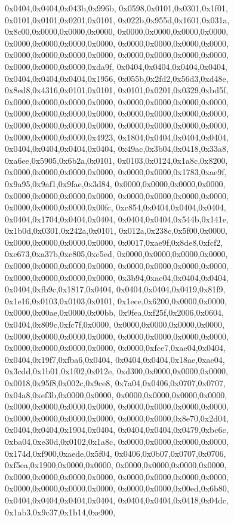 {	0x0404,0x0404,0x043b,0x996b,
	0x0598,0x0101,0x0301,0x1f01,
	0x0101,0x0101,0x0201,0x0101,
	0x022b,0x955d,0x1601,0x031a,
	0x8c00,0x0000,0x0000,0x0000,
	0x0000,0x0000,0x0000,0x0000,
	0x0000,0x0000,0x0000,0x0000,
	0x0000,0x0000,0x0000,0x0000,
	0x0000,0x0000,0x0000,0x0000,
	0x0000,0x0000,0x0000,0x0000,
	0x0000,0x0000,0x0000,0xda9f,
	0x0404,0x0404,0x0404,0x0404,
	0x0404,0x0404,0x0404,0x1956,
	0x055b,0x2fd2,0x56d3,0xd48e,
	0x8ed8,0x4316,0x0101,0x0101,
	0x0101,0x0201,0x0329,0xbd5f,
	0x0000,0x0000,0x0000,0x0000,
	0x0000,0x0000,0x0000,0x0000,
	0x0000,0x0000,0x0000,0x0000,
	0x0000,0x0000,0x0000,0x0000,
	0x0000,0x0000,0x0000,0x0000,
	0x0000,0x0000,0x0000,0x0000,
	0x0000,0x0000,0x0000,0x4923,
	0x1804,0x0404,0x0404,0x0404,
	0x0404,0x0404,0x0404,0x0404,
	0x49ac,0x3b04,0x0418,0x33a8,
	0xa6ee,0x5905,0x6b2a,0x0101,
	0x0103,0x0124,0x1a8c,0x8200,
	0x0000,0x0000,0x0000,0x0000,
	0x0000,0x0000,0x1783,0xae9f,
	0x9a95,0x9af1,0x9fae,0x3d84,
	0x0000,0x0000,0x0000,0x0000,
	0x0000,0x0000,0x0000,0x0000,
	0x0000,0x0000,0x0000,0x0000,
	0x0000,0x0000,0x0000,0x00fc,
	0xc854,0x0404,0x0404,0x0404,
	0x0404,0x1704,0x0404,0x0404,
	0x0404,0x0404,0x544b,0x141e,
	0x1b0d,0x0301,0x242a,0x0101,
	0x012a,0x238c,0x5f00,0x0000,
	0x0000,0x0000,0x0000,0x0000,
	0x0017,0xae9f,0x8de8,0xfcf2,
	0xe673,0xa37b,0xe805,0xc5ed,
	0x0000,0x0000,0x0000,0x0000,
	0x0000,0x0000,0x0000,0x0000,
	0x0000,0x0000,0x0000,0x0000,
	0x0000,0x0000,0x0000,0x0000,
	0x3b94,0xae04,0x0404,0x0404,
	0x0404,0xfb9c,0x1817,0x0404,
	0x0404,0x0404,0x0419,0x81f9,
	0x1e16,0x0103,0x0103,0x0101,
	0x1ece,0x6200,0x0000,0x0000,
	0x0000,0x00ae,0x0000,0x00bb,
	0x9fea,0xf25f,0x2006,0x0604,
	0x0404,0x809c,0xfc7f,0x0000,
	0x0000,0x0000,0x0000,0x0000,
	0x0000,0x0000,0x0000,0x0000,
	0x0000,0x0000,0x0000,0x0000,
	0x0000,0x0000,0x0000,0x0000,
	0x0000,0xfce7,0xae04,0x0404,
	0x0404,0x19f7,0xfba6,0x0404,
	0x0404,0x0404,0x18ae,0xae04,
	0x3cdd,0x1b01,0x1f02,0x012e,
	0xd300,0x0000,0x0000,0x0000,
	0x0018,0x95f8,0x002c,0x9ce8,
	0x7a04,0x0406,0x0707,0x0707,
	0x04a8,0xef3b,0x0000,0x0000,
	0x0000,0x0000,0x0000,0x0000,
	0x0000,0x0000,0x0000,0x0000,
	0x0000,0x0000,0x0000,0x0000,
	0x0000,0x0000,0x0000,0x0000,
	0x0000,0x0000,0x8e70,0x2d04,
	0x0404,0x0404,0x1904,0x0404,
	0x0404,0x0404,0x0479,0xbc6c,
	0xba04,0xe30d,0x0102,0x1a8c,
	0x0000,0x0000,0x0000,0x0000,
	0x174d,0xf900,0xaede,0x5f04,
	0x0406,0x0b07,0x0707,0x0706,
	0xf5ea,0x1900,0x0000,0x0000,
	0x0000,0x0000,0x0000,0x0000,
	0x0000,0x0000,0x0000,0x0000,
	0x0000,0x0000,0x0000,0x0000,
	0x0000,0x0000,0x0000,0x0000,
	0x0000,0x0000,0x00ed,0x6b80,
	0x0404,0x0404,0x0404,0x0404,
	0x0404,0x0404,0x0418,0x04dc,
	0x1ab3,0x9c37,0x1b14,0xe900,
}
